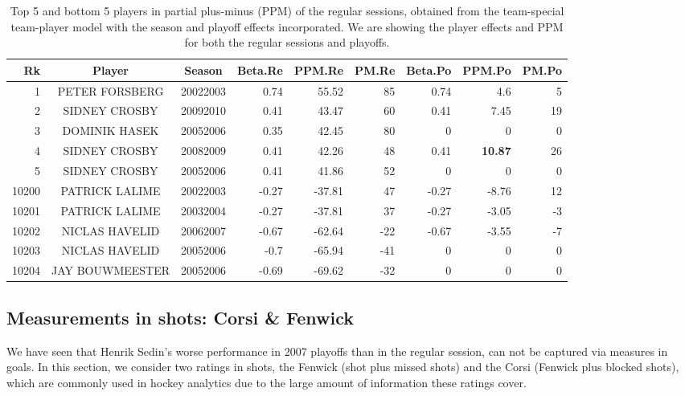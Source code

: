 {
	\renewcommand{\arraystretch}{1.2}
\begin{table}[htbp]
	\centering
	\small
	\begin{tabular}{rccrrrrrr}
		\hline
		Rk    & Player & Season & Beta.Re  & \textbf{PPM}.Re  & PM.Re & Beta.Po & PPM.Po & PM.Po \\
		\hline
		1     & PETER FORSBERG & 20022003 & 0.74  & 55.52 & 85 & 0.74  & 4.6 & 5\\
		2     & SIDNEY CROSBY & 20092010 & 0.41  & 43.47 & 60 & 0.41  & 7.45 & 19\\
		3     & DOMINIK HASEK & 20052006 & 0.35  & 42.45 & 80 & 0     & 0 & 0 \\
		4     & SIDNEY CROSBY & 20082009 & 0.41  & 42.26 & 48 & 0.41  & \textbf{10.87} & 26 \\
		5     & SIDNEY CROSBY & 20052006 & 0.41  & 41.86 & 52 & 0     & 0  & 0\\
		10200 & PATRICK LALIME & 20022003 & -0.27 & -37.81& 47 & -0.27 & -8.76 & 12\\
		10201 & PATRICK LALIME & 20032004 & -0.27 & -37.81& 37 & -0.27 & -3.05 & -3\\
		10202 & NICLAS HAVELID & 20062007 & -0.67 & -62.64 & -22 & -0.67 & -3.55 & -7 \\
		10203 & NICLAS HAVELID & 20052006 & -0.7  & -65.94 & -41 & 0     & 0 & 0\\
		10204 & JAY BOUWMEESTER & 20052006 & -0.69 & -69.62 & -32 & 0     & 0 &0\\
		\hline
	\end{tabular}%
	\caption{Top 5 and bottom 5 players in partial plus-minus (PPM) of the regular sessions, obtained from the team-special team-player model with the season and playoff effects incorporated. We are showing the player effects and PPM for both the regular sessions and playoffs.}\label{tab:goal.ppm.ranking.inter}
\end{table}
}


\subsection{Measurements in shots: Corsi \& Fenwick}
\label{sec:corsifenwick}

We have seen that Henrik Sedin's worse performance in 2007 playoffs than in the regular session, can not be captured via measures in goals. In this section, we consider two ratings in shots, the Fenwick (shot plus missed shots) and the Corsi (Fenwick plus blocked shots), which are commonly used in hockey analytics due to the large amount of information these ratings cover. 

